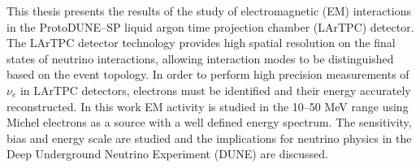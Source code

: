 This thesis presents the results of the study of electromagnetic (EM)
	interactions in the ProtoDUNE--SP liquid argon time projection chamber
	(LArTPC) detector. The LArTPC detector technology provides high spatial
	resolution on the final states of neutrino interactions, allowing interaction 
	modes to be distinguished based on the event topology. In order to perform
	high precision measurements of \(\nu_e\) in LArTPC detectors, electrons must
	be identified and their energy accurately reconstructed. In this work EM
	activity is studied in the 10--50 MeV range using Michel electrons as a source
	with a well defined energy spectrum. The sensitivity, bias and energy scale
	are studied and the implications for neutrino physics in the Deep Underground
	Neutrino Experiment (DUNE) are discussed.
